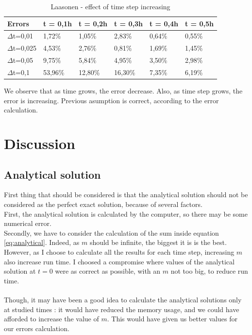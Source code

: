 \documentclass{article}
\begin{document}
            \begin{table}[H]
                \centering
                \caption{Laasonen - effect of time step increasing }
                \label{table:laas}
                \begin{tabular}{|l|l|l|l|l|l|}
                    \hline
                    Errors    & t = 0,1h & t = 0,2h  & t = 0,3h  & t = 0,4h & t = 0,5h \\ \hline
                    $\Delta$t=0,01  & 1,72\%   & 1,05\%  & 2,83\%  & 0,64\% & 0,55\% \\ \hline
                    $\Delta$t=0,025 & 4,53\%   & 2,76\%  & 0,81\%  & 1,69\% & 1,45\% \\ \hline
                    $\Delta$t=0,05  & 9,75\%   & 5,84\%  & 4,95\%  & 3,50\% & 2,98\% \\ \hline
                    $\Delta$t=0,1   & 53,96\%  & 12,80\% & 16,30\% & 7,35\% & 6,19\% \\ \hline
                \end{tabular}
            \end{table}
    
            We observe that as time grows, the error decrease. Also, as time step grows, the error is increasing.
            Previous asumption is correct, according to the error calculation.
        \newpage
        \section{Discussion}
            \subsection{Analytical solution}
                First thing that should be considered is that the analytical solution should not be
                considered as the perfect exact solution, because of several factors.
                \\
                First, the analytical solution is calculated by the computer, so there may be some numerical error.
                \\
                Secondly, we have to consider the calculation of the sum inside equation \eqref{eq:analytical}.
                Indeed, as $m$ should be infinite, the biggest it is is the best. However, as I choose to calculate
                all the results for each time step, increasing $m$ also increase run time. I choosed a compromise
                where values of the analytical solution at $t=0$ were as correct as possible, with an $m$ not too big,
                to reduce run time.
                \\
                \\
                Though, it may have been a good idea to calculate the analytical solutions only at studied times : 
                it would have reduced the memory usage, and we could have afforded to increase the value of $m$.
                This would have given us better values for our errors calculation.
    
\end{document}

